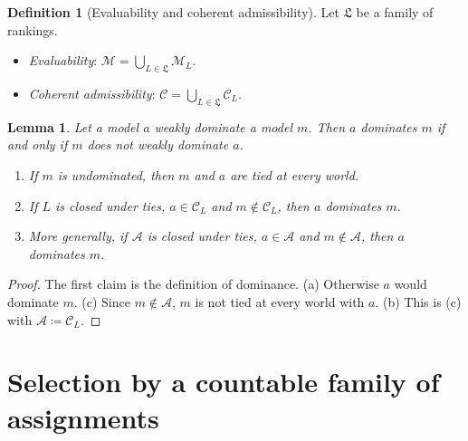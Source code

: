 \documentclass[11pt]{article}
\newtheorem{lemma}[theorem]{Lemma}
\theoremstyle{definition}
\newtheorem{definition}[theorem]{Definition}
\theoremstyle{remark}
\newcommand{\M}{\mathcal M}
\newcommand{\C}{\mathcal C}
\newcommand{\Lf}{\mathfrak L}
\begin{document}
\begin{definition}[Evaluability and coherent admissibility]\label{def:family-assumptions}
Let $\Lf$ be a family of rankings.
\begin{itemize}[leftmargin=*]
\item \emph{Evaluability}: $\M=\bigcup_{L\in\Lf}\M_L$.
\item \emph{Coherent admissibility}: $\C=\bigcup_{L\in\Lf}\C_L$.
\end{itemize}
\end{definition}

\begin{lemma}\label{lem:ties}
Let a model $a$ weakly dominate a model $m$. Then $a$ dominates $m$ if and only if $m$ does not weakly dominate $a$.
\begin{enumerate}[label=(\alph*)]
\item If $m$ is undominated, then $m$ and $a$ are tied at every world.
\item If $L$ is closed under ties, $a\in\C_L$ and $m\notin\C_L$, then $a$ dominates $m$.
\item More generally, if $\mathcal A$ is closed under ties, $a\in\mathcal A$ and $m\notin\mathcal A$, then $a$ dominates $m$.
\end{enumerate}
\end{lemma}
\begin{proof}
The first claim is the definition of dominance. (a) Otherwise $a$ would dominate $m$. (c) Since $m\notin\mathcal A$, $m$ is not tied at every world with $a$. (b) This is (c) with $\mathcal A\coloneqq\C_L$.
\end{proof}

\section{Selection by a countable family of assignments}\label{sec:general}
\end{document}
